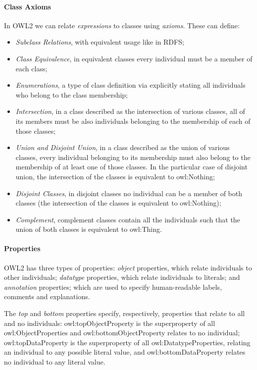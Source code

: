 \paragraph{Class Axioms} In \gls{OWL2} we can relate \emph{expressions} to classes using \emph{axioms}. These can define:

\begin{itemize}
    \item\emph{Subclass Relations}, with equivalent usage like in \gls{RDFS};
    \item\emph{Class Equivalence}, in equivalent classes every individual must be a member of each class;
    \item\emph{Enumerations}, a type of class definition via explicitly stating all individuals who belong to the class membership;
    \item\emph{Intersection}, in a class described as the intersection of various classes, all of its members must be also individuals belonging to the membership of each of those classes;
    \item \emph{Union and Disjoint Union}, in a class described as the union of various classes, every individual belonging to its membership must also belong to the membership of at least one of those classes. In the particular case of disjoint union, the intersection of the classes is equivalent to owl:Nothing;
    \item\emph{Disjoint Classes}, in disjoint classes no individual can be a member of both classes (the intersection of the classes is equivalent to owl:Nothing);
    \item\emph{Complement}, complement classes contain all the individuals such that the union of both classes is equivalent to owl:Thing.
\end{itemize}


\paragraph{Properties} \gls{OWL2} has three types of properties: \emph{object} properties, which relate individuals to other individuals; \emph{datatype} properties, which relate individuals to literals; and \emph{annotation} properties; which are used to specify human-readable labels, comments and explanations. 


The \emph{top} and \emph{bottom} properties specify, respectively, properties that relate to all and no individuals: owl:topObjectProperty is the superproperty of all owl:ObjectProperties and owl:bottomObjectProperty relates to no individual; owl:topDataProperty is the superproperty of all owl:DatatypeProperties, relating an individual to any possible literal value, and owl:bottomDataProperty relates no individual to any literal value.

